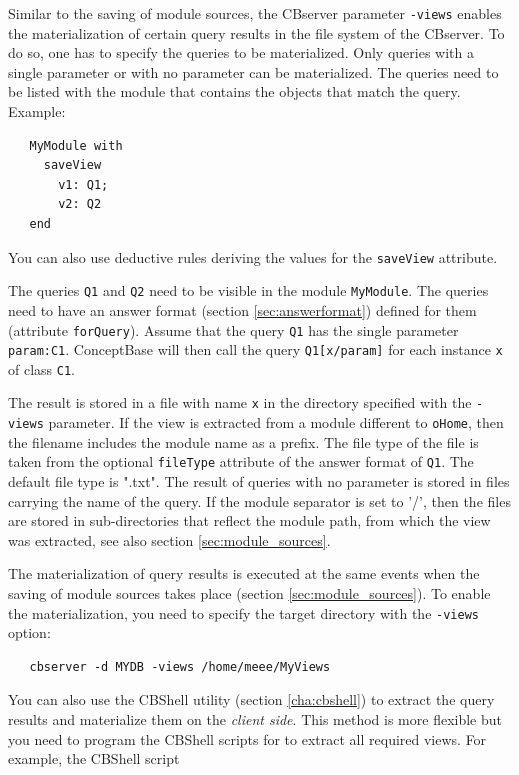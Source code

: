 Similar to the saving of module sources, the CBserver parameter {\tt -views}
enables the materialization of certain query results in the file system of
the CBserver.
To do so, one has to specify the queries to be materialized. Only queries with a
single parameter or with no parameter can be materialized. The queries need to be listed with the
module that contains the objects that match the query. Example:

\begin{verbatim}
   MyModule with
     saveView
       v1: Q1;
       v2: Q2
   end
\end{verbatim}

You can also use deductive rules deriving the values for the {\tt saveView} attribute.

The queries {\tt Q1} and {\tt Q2} need to be visible in the module {\tt MyModule}.
The queries need to have an answer format (section \ref{sec:answerformat})
defined for them (attribute {\tt forQuery}).
Assume that the query {\tt Q1}  has the single parameter {\tt param:C1}. ConceptBase
will then call the query {\tt Q1[x/param]} for each instance {\tt x}  of class {\tt C1}.

The result is stored in a file with name {\tt x} in the directory specified with
the {\tt -views} parameter. If the view is extracted from a module different to
{\tt oHome}, then the filename includes the module name as a prefix. 
The file type of the file is taken from the optional
{\tt fileType} attribute of the answer format of {\tt Q1}. The default file type
is ".txt".
The result of queries with no parameter is stored in files carrying the name of the
query.
If the module separator is set to '/', then the files are stored in sub-directories
that reflect the module path, from which the view was extracted, see
also section \ref{sec:module_sources}.

The materialization of query results is executed at the same events when the 
saving of module sources takes place (section \ref{sec:module_sources}).
To enable the materialization, you need to 
specify the target directory with the {\tt -views} option:

\begin{verbatim}
   cbserver -d MYDB -views /home/meee/MyViews 
\end{verbatim}

You can also use the CBShell utility (section \ref{cha:cbshell}) to extract
the query results and materialize them on the {\em client side}. This method
is more flexible but you need to program the CBShell scripts for
to extract all required views. For example, the CBShell script

